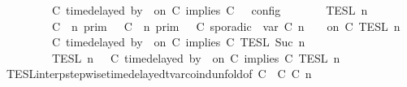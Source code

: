 \begin{isabellebody}
\ \ \ \ \ \ \ \ {\isasymtriangleright}\ {\isacharparenleft}{\isacharparenleft}C\ time{\isacharminus}delayed{\isasymbowtie}\ by\ {\isasymdelta}{\isasymtau}\ on\ C\ implies\ C\ {\isacharhash}\ {\isasymPhi}{\isacharparenright}\ {\isasymrbrakk}\isactrlsub c\isactrlsub o\isactrlsub n\isactrlsub f\isactrlsub i\isactrlsub g{\isacartoucheclose}\isanewline
%
\isadelimproof
%
\endisadelimproof
%
\isatagproof
{}\isamarkupfalse%
\ {\isacharminus}\isanewline
\ \ \isamarkupfalse%
\ {\isacartoucheopen}{\isasymlbrakk}{\isasymlbrakk}\ {\isasymPsi}\ {\isasymrbrakk}{\isasymrbrakk}\isactrlsub T\isactrlsub E\isactrlsub S\isactrlsub L\isactrlbsup {\isasymge}\ n\isactrlesup \isanewline
\ \ \ \ \ \ \ {\isasyminter}\ {\isacharparenleft}{\isasymlbrakk}\ C\ {\isasymnot}{\isasymUp}\ n\ {\isasymrbrakk}\isactrlsub p\isactrlsub r\isactrlsub i\isactrlsub m\ {\isasymunion}\ {\isasymlbrakk}\ C\ {\isasymUp}\ n\ {\isasymrbrakk}\isactrlsub p\isactrlsub r\isactrlsub i\isactrlsub m\ {\isasyminter}\ {\isasymlbrakk}\ C\ sporadic{\isasymsharp}\ {\isasymlparr}\ {\isasymtau}\isactrlsub v\isactrlsub a\isactrlsub r\ {\isacharparenleft}C\ n{\isacharparenright}\ {\isasymoplus}\ {\isasymdelta}{\isasymtau}\ {\isasymrparr}\ on\ C\ {\isasymrbrakk}\isactrlsub T\isactrlsub E\isactrlsub S\isactrlsub L\isactrlbsup {\isasymge}\ n\isactrlesup {\isacharparenright}\isanewline
\ \ \ \ \ \ \ {\isasyminter}\ {\isasymlbrakk}\ C\ time{\isacharminus}delayed{\isasymbowtie}\ by\ {\isasymdelta}{\isasymtau}\ on\ C\ implies\ C\ {\isasymrbrakk}\isactrlsub T\isactrlsub E\isactrlsub S\isactrlsub L\isactrlbsup {\isasymge}\ Suc\ n\isactrlesup \isanewline
\ \ \ \ \ \ {\isacharequal}\ {\isasymlbrakk}{\isasymlbrakk}\ {\isasymPsi}\ {\isasymrbrakk}{\isasymrbrakk}\isactrlsub T\isactrlsub E\isactrlsub S\isactrlsub L\isactrlbsup {\isasymge}\ n\isactrlesup \ {\isasyminter}\ {\isasymlbrakk}\ C\ time{\isacharminus}delayed{\isasymbowtie}\ by\ {\isasymdelta}{\isasymtau}\ on\ C\ implies\ C\ {\isasymrbrakk}\isactrlsub T\isactrlsub E\isactrlsub S\isactrlsub L\isactrlbsup {\isasymge}\ n\isactrlesup {\isacartoucheclose}\isanewline
\ \ \ \ \isamarkupfalse%
\ TESL{\isacharunderscore}interp{\isacharunderscore}stepwise{\isacharunderscore}timedelayed{\isacharunderscore}tvar{\isacharunderscore}coind{\isacharunderscore}unfold{\isacharbrackleft}of\ {\isacartoucheopen}C\ {\isacartoucheopen}{\isasymdelta}{\isasymtau}{\isacartoucheclose}\ {\isacartoucheopen}C\ {\isacartoucheopen}C\ {\isacartoucheopen}n{\isacartoucheclose}{\isacharbrackright}\isanewline

\end{isabellebody}
